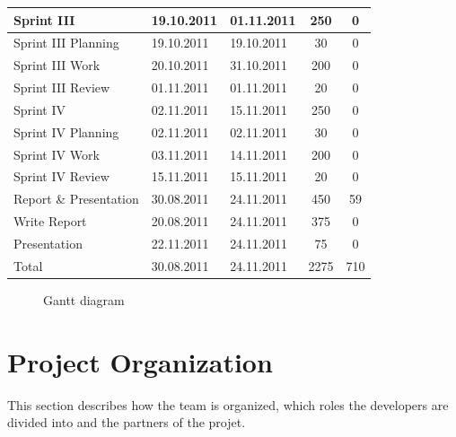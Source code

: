\begin{table}[!htb]
\begin{tabular}{l l l c c}
	\midrule
	Sprint III & 19.10.2011 & 01.11.2011 & 250 & 0 \\
	\midrule
	Sprint III Planning & 19.10.2011 & 19.10.2011 & 30 & 0 \\
	Sprint III Work & 20.10.2011 & 31.10.2011 & 200 & 0 \\
	Sprint III Review & 01.11.2011 & 01.11.2011 & 20 & 0 \\
	\midrule
	Sprint IV & 02.11.2011 & 15.11.2011 & 250 & 0 \\
	\midrule
	Sprint IV Planning & 02.11.2011 & 02.11.2011 & 30 & 0 \\
	Sprint IV Work & 03.11.2011 & 14.11.2011 & 200 & 0 \\
	Sprint IV Review & 15.11.2011 & 15.11.2011 & 20 & 0 \\
	\midrule
	Report \& Presentation & 30.08.2011 & 24.11.2011 & 450 & 59 \\
	\midrule
	Write Report & 20.08.2011 & 24.11.2011 & 375 & 0 \\
	Presentation & 22.11.2011 & 24.11.2011 & 75 & 0 \\
	\midrule
	Total & 30.08.2011 & 24.11.2011 & 2275 & 710 \\
	\bottomrule
\end{tabular}
\end{table}

\begin{figure}[!htb]
	\noindent{}
	\caption{Gantt diagram\label{fig:gantt}}
\end{figure}


\section{Project Organization}
\label{sec:plan:org}
This section describes how the team is organized, which roles the developers are divided into and the partners of the projet.

